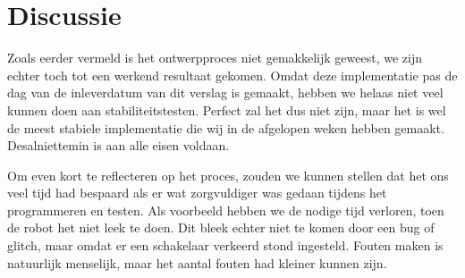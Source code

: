 \documentclass{report}
\begin{document}
\section{Discussie}

Zoals eerder vermeld is het ontwerpproces niet gemakkelijk geweest, we zijn echter toch tot een werkend resultaat gekomen. Omdat deze implementatie pas de dag van de inleverdatum van dit verslag is gemaakt, hebben we helaas niet veel kunnen doen aan stabiliteitstesten. Perfect zal het dus niet zijn, maar het is wel de meest stabiele implementatie die wij in de afgelopen weken hebben gemaakt. Desalniettemin is aan alle eisen voldaan.

Om even kort te reflecteren op het proces, zouden we kunnen stellen dat het ons veel tijd had bespaard als er wat zorgvuldiger was gedaan tijdens het programmeren en testen. Als voorbeeld hebben we de nodige tijd verloren, toen de robot het niet leek te doen. Dit bleek echter niet te komen door een bug of glitch, maar omdat er een schakelaar verkeerd stond ingesteld.
Fouten maken is natuurlijk menselijk, maar het aantal fouten had kleiner kunnen zijn.
\end{document}
